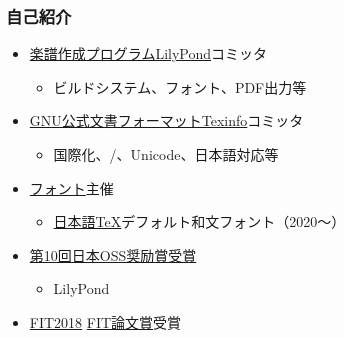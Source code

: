 \begin{frame}\frametitle{自己紹介}
  \begin{itemize}
    \small
  \item \href{http://lilypond.org/}{楽譜作成プログラムLilyPond}コミッタ
    \begin{itemize}\footnotesize
    \item ビルドシステム、フォント、PDF出力等
    \end{itemize}
  \item \href{https://www.gnu.org/software/texinfo/}
    {GNU公式文書フォーマットTexinfo}コミッタ
    \begin{itemize}\footnotesize
    \item 国際化、\XeTeX /\LuaTeX 、Unicode、日本語対応等
    \end{itemize}
  \item \href{https://github.com/trueroad/HaranoAjiFonts}
    {フォント}主催
    \begin{itemize}\footnotesize
    \item \href{https://texjp.org/}{日本語\TeX}デフォルト和文フォント（2020～）
    \end{itemize}
  \item \href{http://ossforum.jp/ossaward10th2}{第10回日本OSS奨励賞受賞}
    \begin{itemize}\footnotesize
    \item LilyPond
    \end{itemize}
  \item \href{https://www.ipsj.or.jp/event/fit/fit2018/}{FIT2018}
    \href{https://www.ipsj.or.jp/award/fit_ronbun.html}{FIT論文賞}受賞
  \end{itemize}

\end{frame}

